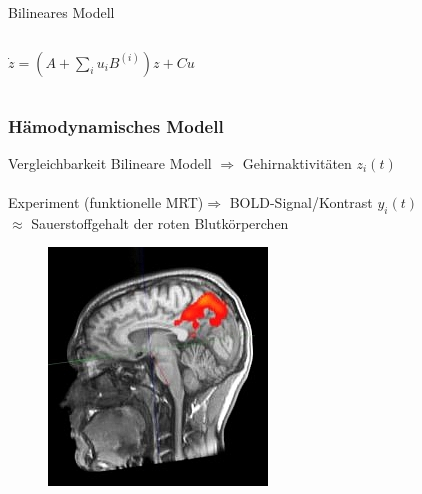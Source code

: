 \documentclass{beamer}
\begin{document}
\begin{frame}{Bilineares Modell}
\begin{columns}
{\begin{minipage}{\textwidth}
					\hspace{5pt}
					$
					\dot{z} =(A+\sum_{i}u_iB^{(i)})z+Cu
					$
				\end{minipage}	
			}
		\end{columns}
	\end{frame}	
	
\subsubsection{Hämodynamisches Modell}
\begin{frame}{Vergleichbarkeit}
Bilineare Modell $\Rightarrow$ Gehirnaktivitäten $z_i(t)$\\~\\
Experiment (funktionelle MRT)$\Rightarrow$ BOLD-Signal/Kontrast $y_i(t)$\\
\hspace{3cm} $\approx$ Sauerstoffgehalt der roten Blutkörperchen 
\begin{figure}
{\includegraphics[width=0.3 \textwidth]{res/bold_signal.jpg}}
\end{figure}
\end{frame}
\end{document}
